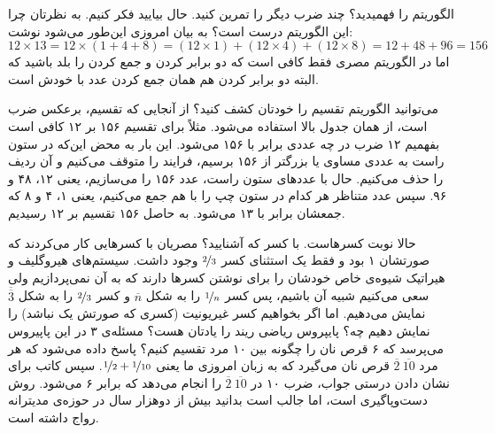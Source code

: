      الگوریتم را فهمیدید؟ چند ضرب دیگر را تمرین کنید. حال بیایید فکر کنیم. به نظرتان چرا این الگوریتم درست است؟ به بیان امروزی این‌طور می‌شود نوشت:
     $$12 \times 13 = 12 \times (1+4+8) = (12 \times 1) + (12 \times 4) + (12 \times 8) = 12+48+96 = 156$$
     اما در الگوریتم مصری فقط کافی است که دو برابر کردن و جمع کردن را بلد باشید که البته دو برابر کردن هم همان جمع کردن عدد با خودش است.
     
     می‌توانید الگوریتم تقسیم را خودتان کشف کنید؟ از آنجایی که تقسیم، برعکس ضرب است، از همان جدول بالا استفاده می‌شود. مثلاً برای تقسیم ۱۵۶ بر ۱۲ کافی است بفهمیم ۱۲ ضرب در چه عددی برابر با ۱۵۶ می‌شود. این بار به محض این‌که در ستون راست به عددی مساوی یا بزرگتر از ۱۵۶ برسیم، فرایند را متوقف می‌کنیم و آن ردیف را حذف می‌کنیم. حال با عددهای ستون راست، عدد ۱۵۶ را می‌سازیم، یعنی ۱۲، ۴۸ و ۹۶. سپس عدد متناظر هر کدام در ستون چپ را با هم جمع می‌کنیم، یعنی ۱، ۴ و ۸ که جمعشان برابر با ۱۳ می‌شود. به حاصل ۱۵۶ تقسیم بر ۱۲ رسیدیم.
     
     حالا نوبت کسرهاست. با کسر که آشنایید؟ مصریان با کسرهایی کار می‌کردند که صورتشان ۱ بود%
     و فقط یک استثنای کسر
     $\nicefrac{2}{3}$
     وجود داشت. سیستم‌های هیروگلیف و هیراتیک شیوه‌ی خاص خودشان را برای نوشتن کسرها دارند که به آن نمی‌پردازیم ولی سعی می‌کنیم شبیه آن باشیم، پس کسر
     $\nicefrac{1}{n}$
     را به شکل $\overline{n}$ و کسر
     $\nicefrac{2}{3}$
     را به شکل
     $\overline{\overline{3}}$
     نمایش می‌دهیم. اما اگر بخواهیم کسر غیریونیت (کسری که صورتش یک نباشد) را نمایش دهیم چه؟ پایپروس ریاضی ریند را یادتان هست؟ مسئله‌ی ۳ در این پاپیروس می‌پرسد که ۶ قرص نان را چگونه بین ۱۰ مرد تقسیم کنیم؟ پاسخ داده می‌شود که هر مرد
     $\overline{2} \ \overline{10}$
     قرص نان می‌گیرد که به زبان امروزی ما یعنی
     $\nicefrac{1}{2} + \nicefrac{1}{10}$.
     سپس کاتب برای نشان دادن درستی جواب، ضرب ۱۰ در
     $\overline{2} \ \overline{10}$
     را انجام می‌دهد که برابر ۶ می‌شود. روش دست‌وپاگیری است، اما جالب است بدانید بیش از دوهزار سال در حوزه‌ی مدیترانه رواج داشته است.
     
